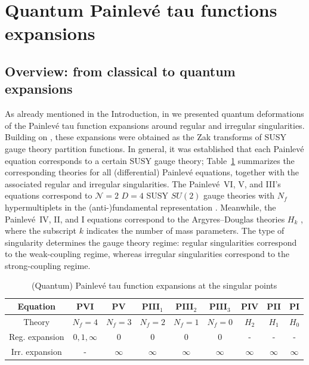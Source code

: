 \documentclass[12pt,a4paper]{article}
\numberwithin{equation}{section}
\begin{document}
\section{Quantum Painlev\'e tau functions expansions}
\label{sec:asymptotics}
\setcounter{subsection}{-1}

\subsection{Overview: from classical to quantum expansions}
As already mentioned in the Introduction, in \cite{BST25} we presented quantum deformations of the Painlev\'e tau function expansions around regular and irregular singularities. Building on \cite{GIL12}, these expansions were obtained as the Zak transforms of SUSY gauge theory partition functions. In general, it was established that each Painlev\'e equation corresponds to a certain SUSY gauge theory; Table~\ref{tab:theories} summarizes the corresponding theories for all (differential) Painlev\'e equations, together with the associated regular and irregular singularities. The Painlev\'e~VI, V, and III's equations correspond to $\mathcal{N}=2$ $D=4$ SUSY $SU(2)$ gauge theories with $N_f$ hypermultiplets in the (anti-)fundamental representation \cite{GIL13}. Meanwhile, the Painlev\'e~IV, II, and I equations correspond to the Argyres--Douglas theories $H_k$ \cite{BLMST16}, where the subscript $k$ indicates the number of mass parameters. The type of singularity determines the gauge theory regime: regular singularities correspond to the weak-coupling regime, whereas irregular singularities correspond to the strong-coupling regime.
\begin{table}[H]
    \centering
    \begin{tabular}{|c|c|c|c|c|c||c|c|c|}
      \hline Equation & PVI & PV & PIII$_1$ & PIII$_2$ & PIII$_3$ & PIV & PII & PI \\ \hline
        Theory & $N_f=4$ & $N_f=3$ & $N_f=2$ & $N_f=1$ & $N_f=0$ & $H_2$ & $H_1$ & $H_0$ \\ \hline\hline
        Reg. expansion & $0,1,\infty$ & 0 & 0 & 0 & 0 & - & - & -  \\ 
        \hline
        Irr. expansion & - & $\infty$ & $\infty$ & $\infty$ & $\infty$ & $\infty$ & $\infty$ & $\infty$  \\ \hline
    \end{tabular}
    \caption{(Quantum) Painlev\'e tau function expansions at the singular points}
    \label{tab:theories}
\end{table}
\end{document}

